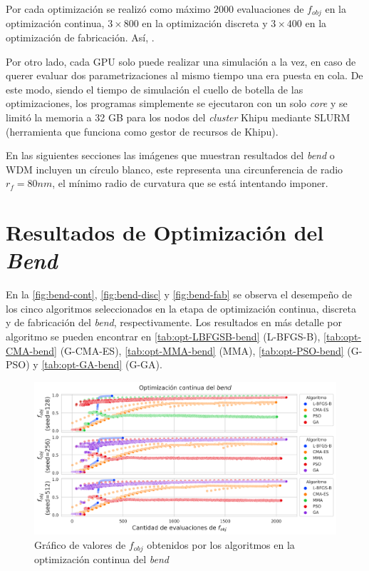 Por cada optimización se realizó como máximo $2000$ evaluaciones de $f_{obj}$ en la optimización continua,
$3 \times 800$ en la optimización discreta y $3 \times 400$ en la optimización de fabricación.
Así, .

Por otro lado, cada GPU solo puede realizar una simulación a la vez, en caso de querer 
evaluar dos parametrizaciones al mismo tiempo una era puesta en cola. De este modo,
siendo el tiempo de simulación el cuello de botella de las optimizaciones, los programas simplemente
se ejecutaron con un solo \emph{core} y se limitó la memoria a 32 GB para los nodos del \emph{cluster}
Khipu mediante SLURM (herramienta que funciona como gestor de recursos de Khipu).


En las siguientes secciones las imágenes que muestran resultados del \emph{bend} o WDM
incluyen un círculo blanco, este representa una circunferencia de radio $r_f = 80 nm$,
el mínimo radio de curvatura que se está intentando imponer.


\section{Resultados de Optimización del \emph{Bend}}\label{sec:results-bend}


En la \autoref{fig:bend-cont}, \autoref{fig:bend-disc} y \autoref{fig:bend-fab} se observa 
el desempeño de los cinco algoritmos seleccionados en la etapa de optimización continua, discreta y
de fabricación del \emph{bend}, respectivamente.
Los resultados en más detalle por algoritmo se pueden encontrar en 
\autoref{tab:opt-LBFGSB-bend} (L-BFGS-B),
\autoref{tab:opt-CMA-bend} (G-CMA-ES),
\autoref{tab:opt-MMA-bend} (MMA),
\autoref{tab:opt-PSO-bend} (G-PSO) y
\autoref{tab:opt-GA-bend} (G-GA).

\begin{landscape}
\begin{figure}[ht]
  \centering
  \includegraphics[scale=1.0]{image/results/bend/bend-opt-cont.png}
  \caption{Gráfico de valores de $f_{obj}$ obtenidos por los algoritmos en la optimización continua del \emph{bend}}
  \label{fig:bend-cont}
\end{figure}
\end{landscape}

